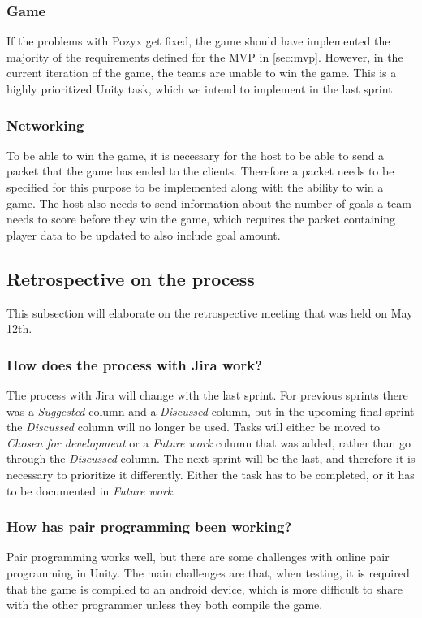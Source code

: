 \subsubsection{Game}
If the problems with Pozyx get fixed, the game should have implemented the majority of the requirements defined for the MVP in \autoref{sec:mvp}.
However, in the current iteration of the game, the teams are unable to win the game.
This is a highly prioritized Unity task, which we intend to implement in the last sprint.

\subsubsection{Networking}
To be able to win the game, it is necessary for the host to be able to send a packet that the game has ended to the clients.
Therefore a packet needs to be specified for this purpose to be implemented along with the ability to win a game.
The host also needs to send information about the number of goals a team needs to score before they win the game, which requires the packet containing player data to be updated to also include goal amount.


\subsection{Retrospective on the process}
This subsection will elaborate on the retrospective meeting that was held on May 12th.

\subsubsection*{How does the process with Jira work?}
The process with Jira will change with the last sprint.
For previous sprints there was a \textit{Suggested} column and a \textit{Discussed} column, but in the upcoming final sprint the \textit{Discussed} column will no longer be used.
Tasks will either be moved to \textit{Chosen for development} or a \textit{Future work} column that was added, rather than go through the \textit{Discussed} column.
The next sprint will be the last, and therefore it is necessary to prioritize it differently.
Either the task has to be completed, or it has to be documented in \textit{Future work}.

\subsubsection*{How has pair programming been working?}
Pair programming works well, but there are some challenges with online pair programming in Unity.
The main challenges are that, when testing, it is required that the game is compiled to an android device, which is more difficult to share with the other programmer unless they both compile the game.

